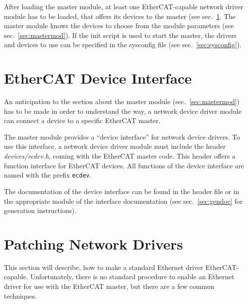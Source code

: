 \documentclass[a4paper,12pt,BCOR6mm,bibtotoc,idxtotoc]{scrbook}
\begin{document}
After loading the master module, at least one EtherCAT-capable network driver
module has to be loaded, that offers its devices to the master (see
sec.~\ref{sec:ecdev}. The master module knows the devices to choose from the
module parameters (see sec.~\ref{sec:mastermod}). If the init script is used
to start the master, the drivers and devices to use can be specified in the
sysconfig file (see sec.~\ref{sec:sysconfig}).


\section{EtherCAT Device Interface}
\label{sec:ecdev}

An anticipation to the section about the master module
(sec.~\ref{sec:mastermod}) has to be made in order to understand the way, a
network device driver module can connect a device to a specific EtherCAT
master.

The master module provides a ``device interface'' for network device drivers.
To use this interface, a network device driver module must include the header
\textit{devices/ecdev.h}, coming with the
EtherCAT master code. This header offers a function interface for EtherCAT
devices. All functions of the device interface are named with the prefix
\lstinline+ecdev+.

The documentation of the device interface can be found in the header file or
in the appropriate module of the interface documentation (see
sec.~\ref{sec:gendoc} for generation instructions).



\section{Patching Network Drivers}
\label{sec:patching}

This section will describe, how to make a standard Ethernet driver
EtherCAT-capable. Unfortunately, there is no standard procedure to enable an
Ethernet driver for use with the EtherCAT master, but there are a few common
techniques.
\end{document}
